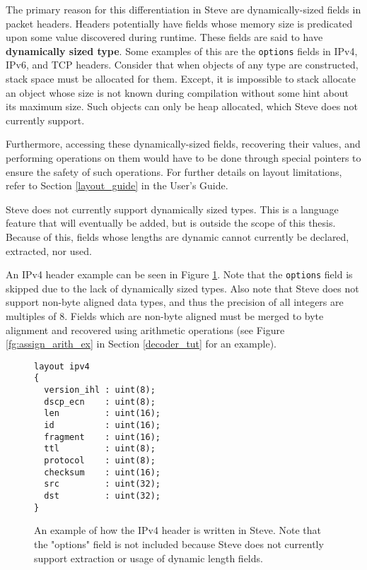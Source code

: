 The primary reason for this differentiation in Steve are dynamically-sized fields in packet headers. Headers potentially have fields whose memory size is predicated upon some value discovered during runtime. These fields are said to have \textbf{dynamically sized type}. Some examples of this are the \texttt{options} fields in IPv4, IPv6, and TCP headers. Consider that when objects of any type are constructed, stack space must be allocated for them. Except, it is impossible to stack allocate an object whose size is not known during compilation without some hint about its maximum size. Such objects can only be heap allocated, which Steve does not currently support. 

Furthermore, accessing these dynamically-sized fields, recovering their values, and performing operations on them would have to be done through special pointers to ensure the safety of such operations. For further details on layout limitations, refer to Section \ref{layout_guide} in the User's Guide.

Steve does not currently support dynamically sized types. This is a language feature that will eventually be added, but is outside the scope of this thesis. Because of this, fields whose lengths are dynamic cannot currently be declared, extracted, nor used. 

An IPv4 header example can be seen in Figure \ref{fg:ipv4_layout_ex}. Note that the \texttt{options} field is skipped due to the lack of dynamically sized types. Also note that Steve does not support non-byte aligned data types, and thus the precision of all integers are multiples of 8. Fields which are non-byte aligned must be merged to byte alignment and recovered using arithmetic operations (see Figure \ref{fg:assign_arith_ex} in Section \ref{decoder_tut} for an example). 

\begin{figure}
\begin{lstlisting}
layout ipv4
{
  version_ihl : uint(8);
  dscp_ecn    : uint(8);
  len         : uint(16);
  id          : uint(16);
  fragment    : uint(16);
  ttl         : uint(8);
  protocol    : uint(8);
  checksum    : uint(16);
  src         : uint(32);
  dst         : uint(32);
}
\end{lstlisting}
\caption{An example of how the IPv4 header is written in Steve. Note that the "options" field is not included because Steve does not currently support extraction or usage of dynamic length fields.}
\label{fg:ipv4_layout_ex}
\end{figure}


